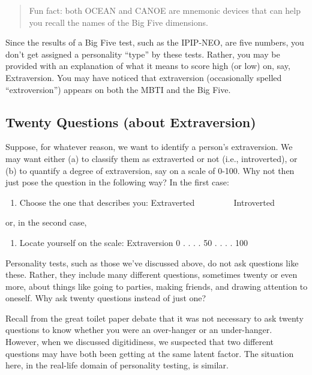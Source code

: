 \documentclass[openany]{book}
\providecommand{\tightlist}{%
  \setlength{\itemsep}{0pt}\setlength{\parskip}{0pt}}
\begin{document}
\begin{quote}
Fun fact: both OCEAN and CANOE are mnemonic devices that can help you recall the names of the Big Five dimensions.
\end{quote}

Since the results of a Big Five test, such as the IPIP-NEO, are five numbers, you don't get assigned a personality ``type'' by these tests. Rather, you may be provided with an explanation of what it means to score high (or low) on, say, Extraversion. You may have noticed that extraversion (occasionally spelled ``extroversion'') appears on both the MBTI and the Big Five.

\hypertarget{twenty-questions-about-extraversion}{%
\subsection*{Twenty Questions (about Extraversion)}\label{twenty-questions-about-extraversion}}

Suppose, for whatever reason, we want to identify a person's extraversion. We may want either (a) to classify them as extraverted or not (i.e., introverted), or (b) to quantify a degree of extraversion, say on a scale of 0-100. Why not then just pose the question in the following way? In the first case:

\begin{enumerate}
\def\labelenumi{\alph{enumi})}
\tightlist
\item
  Choose the one that describes you: Extraverted ~~~~\textbar{} ~~~~Introverted
\end{enumerate}

or, in the second case,

\begin{enumerate}
\def\labelenumi{\alph{enumi})}
\setcounter{enumi}{1}
\tightlist
\item
  Locate yourself on the scale: Extraversion 0 . . . . 50 . . . . 100
\end{enumerate}

Personality tests, such as those we've discussed above, do not ask questions like these. Rather, they include many different questions, sometimes twenty or even more, about things like going to parties, making friends, and drawing attention to oneself. Why ask twenty questions instead of just one?

Recall from the great toilet paper debate that it was not necessary to ask twenty questions to know whether you were an over-hanger or an under-hanger. However, when we discussed digitidiness, we suspected that two different questions may have both been getting at the same latent factor. The situation here, in the real-life domain of personality testing, is similar.
\end{document}
